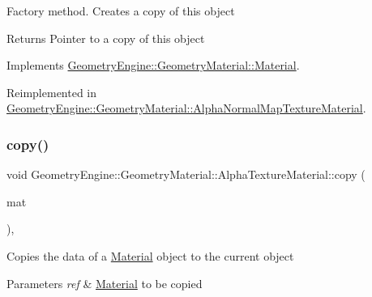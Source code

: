 Factory method. Creates a copy of this object \begin{DoxyReturn}{Returns}
Pointer to a copy of this object 
\end{DoxyReturn}


Implements \mbox{\hyperlink{class_geometry_engine_1_1_geometry_material_1_1_material_ae5513ff06d536365e18ddc5e07e79784}{Geometry\+Engine\+::\+Geometry\+Material\+::\+Material}}.



Reimplemented in \mbox{\hyperlink{class_geometry_engine_1_1_geometry_material_1_1_alpha_normal_map_texture_material_a4dff732a06c94a7761a054ca62dbd491}{Geometry\+Engine\+::\+Geometry\+Material\+::\+Alpha\+Normal\+Map\+Texture\+Material}}.

\mbox{\label{class_geometry_engine_1_1_geometry_material_1_1_alpha_texture_material_a30869b528be940b9041707570459dcdf}} 
\subsubsection{\texorpdfstring{copy()}{copy()}}
{\footnotesize\ttfamily void Geometry\+Engine\+::\+Geometry\+Material\+::\+Alpha\+Texture\+Material\+::copy (\begin{DoxyParamCaption}\item[{const \mbox{\hyperlink{class_geometry_engine_1_1_geometry_material_1_1_alpha_texture_material}{Alpha\+Texture\+Material}} \&}]{mat }\end{DoxyParamCaption})\hspace{0.3cm}{\ttfamily [protected]}, {\ttfamily [virtual]}}

Copies the data of a \mbox{\hyperlink{class_geometry_engine_1_1_geometry_material_1_1_material}{Material}} object to the current object 
\begin{DoxyParams}{Parameters}
{\em ref} & \mbox{\hyperlink{class_geometry_engine_1_1_geometry_material_1_1_material}{Material}} to be copied \\
\hline
\end{DoxyParams}
\mbox{\label{class_geometry_engine_1_1_geometry_material_1_1_alpha_texture_material_a4080f2353ed87dc47589ac5568f48c43}} 
